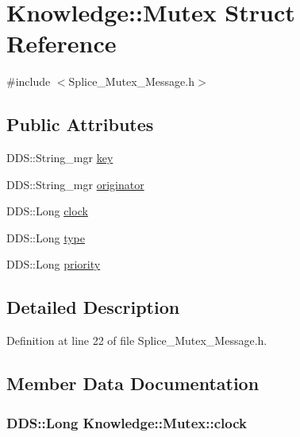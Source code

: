 \hypertarget{structKnowledge_1_1Mutex}{
\section{Knowledge::Mutex Struct Reference}
\label{db/dd3/structKnowledge_1_1Mutex}
}


{\ttfamily \#include $<$Splice\_\-Mutex\_\-Message.h$>$}

\subsection*{Public Attributes}
\begin{DoxyCompactItemize}
\item 
DDS::String\_\-mgr \hyperlink{structKnowledge_1_1Mutex_a00c160c9de099889de59c0aaca7f906b}{key}
\item 
DDS::String\_\-mgr \hyperlink{structKnowledge_1_1Mutex_a1886b9af38f6c87820496e305f2169c9}{originator}
\item 
DDS::Long \hyperlink{structKnowledge_1_1Mutex_a93587e4eed8be22a3056aa44bb9880b2}{clock}
\item 
DDS::Long \hyperlink{structKnowledge_1_1Mutex_a7275fa50467479a83ab5e70007cba594}{type}
\item 
DDS::Long \hyperlink{structKnowledge_1_1Mutex_a94783f1624d466c78b0cde9b73e3e6f0}{priority}
\end{DoxyCompactItemize}


\subsection{Detailed Description}


Definition at line 22 of file Splice\_\-Mutex\_\-Message.h.



\subsection{Member Data Documentation}
\hypertarget{structKnowledge_1_1Mutex_a93587e4eed8be22a3056aa44bb9880b2}{
\subsubsection[{clock}]{\setlength{\rightskip}{0pt plus 5cm}DDS::Long {\bf Knowledge::Mutex::clock}}}
\label{db/dd3/structKnowledge_1_1Mutex_a93587e4eed8be22a3056aa44bb9880b2}


